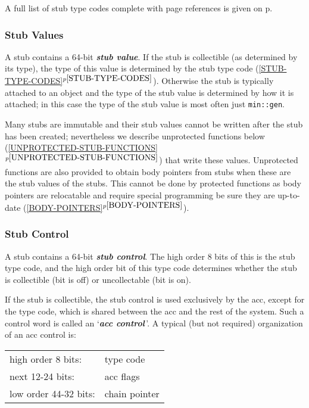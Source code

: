 \documentclass[12pt]{article}
\newcommand{\key}[1]{{\bf \em #1}\index{#1}}
\newcommand{\itemref}[1]{\ref{#1}$^{p\pageref{#1}}$}
\newcommand{\pagref}[1]{p\pageref{#1}}
\begin{document}
A full list of stub type codes complete with page references
is given on \pagref{STUB-TYPE-CODE-LIST}.

\subsubsection{Stub Values}
\label{STUB-VALUES}

A stub contains a 64-bit \key{stub value}.  If the stub is collectible
(as determined by its type), the type of this value
is determined by the stub type code (\itemref{STUB-TYPE-CODES}).
Otherwise the stub is typically attached to an object and the type of the stub
value is determined by how it is attached; in this case the type of the
stub value is most often just \verb|min::gen|.

Many stubs are immutable
and their stub values cannot be written after the stub has been created;
nevertheless we describe unprotected functions
below (\itemref{UNPROTECTED-STUB-FUNCTIONS}) that
write these values.  Unprotected functions are also provided to obtain
body pointers from stubs when these are the stub values of the stubs.
This cannot be done by protected
functions as body pointers are relocatable and require special
programming be sure they are up-to-date (\itemref{BODY-POINTERS}).

\subsubsection{Stub Control}
\label{STUB-CONTROL}

A stub contains a 64-bit \key{stub control}.  The high order 8 bits
of this is the stub type code, and the high order bit of this type
code determines whether the stub is collectible (bit is off)
or uncollectable (bit is on).

If the stub is collectible,
the stub control is used exclusively by the acc,
except for the type code, which is shared between the acc
and the rest of the system.  Such a control word is called
an `\key{acc control}\,'.  A typical (but not required)
organization of an acc control is:

\begin{center}
\begin{tabular}{ll}
high order 8 bits:	& type code \\
next 12-24 bits:	& acc flags \\
low order 44-32 bits:	& chain pointer \\
\end{tabular}
\end{center}
\end{document}
